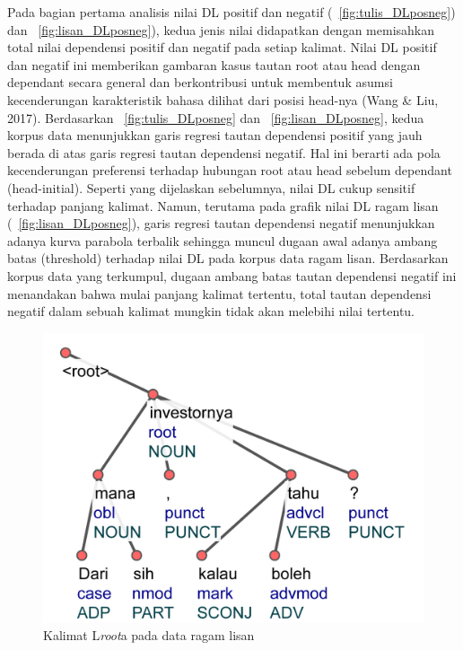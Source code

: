 Pada bagian pertama analisis nilai DL positif dan negatif (\pic~\ref{fig:tulis_DLposneg}) dan \pic~\ref{fig:lisan_DLposneg}), kedua jenis nilai didapatkan dengan memisahkan total nilai dependensi positif dan negatif pada setiap kalimat. Nilai DL positif dan negatif ini memberikan gambaran kasus tautan root atau head dengan dependant secara general dan berkontribusi untuk membentuk asumsi kecenderungan karakteristik bahasa dilihat dari posisi head-nya (Wang & Liu, 2017). Berdasarkan \pic~\ref{fig:tulis_DLposneg} dan \pic~\ref{fig:lisan_DLposneg}, kedua korpus data menunjukkan garis regresi tautan dependensi positif yang jauh berada di atas garis regresi tautan dependensi negatif. Hal ini berarti ada pola kecenderungan preferensi terhadap hubungan root atau head sebelum dependant (head-initial). Seperti yang dijelaskan sebelumnya, nilai DL cukup sensitif terhadap panjang kalimat. Namun, terutama pada grafik nilai DL ragam lisan (\pic~\ref{fig:lisan_DLposneg}), garis regresi tautan dependensi negatif menunjukkan adanya kurva parabola terbalik sehingga muncul dugaan awal adanya ambang batas (threshold) terhadap nilai DL pada korpus data ragam lisan. Berdasarkan korpus data yang terkumpul, dugaan ambang batas tautan dependensi negatif ini menandakan bahwa mulai panjang kalimat tertentu, total tautan dependensi negatif dalam sebuah kalimat mungkin tidak akan melebihi nilai tertentu. 

\begin{figure}
	\centering \includegraphics[width=1
	\textwidth] {pics/ls1436.jpg} 
	\caption{Kalimat L\textit{root}a pada data ragam lisan}
	\label{fig:ls1436} 
\end{figure}

